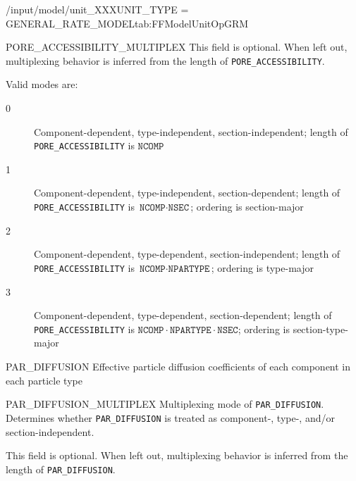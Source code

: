 \begin{condsubgroup}{/input/model/unit\_XXX}{UNIT\_TYPE = GENERAL\_RATE\_MODEL}{tab:FFModelUnitOpGRM}
\begin{dataset}[unit=--,type=int,range={$\{0, \dots, 3 \}$},length={1}]{PORE\_ACCESSIBILITY\_MULTIPLEX}
    This field is optional.
    When left out, multiplexing behavior is inferred from the length of \texttt{PORE\_ACCESSIBILITY}.

    Valid modes are:
    \begin{description}
      \item[0] Component-dependent, type-independent, section-independent; length of \texttt{PORE\_ACCESSIBILITY} is $\texttt{NCOMP}$
      \item[1] Component-dependent, type-independent, section-dependent; length of \texttt{PORE\_ACCESSIBILITY} is $\texttt{NCOMP} \cdot \texttt{NSEC}$; ordering is section-major
      \item[2] Component-dependent, type-dependent, section-independent; length of \texttt{PORE\_ACCESSIBILITY} is $\texttt{NCOMP} \cdot \texttt{NPARTYPE}$; ordering is type-major
      \item[3] Component-dependent, type-dependent, section-dependent; length of \texttt{PORE\_ACCESSIBILITY} is $\texttt{NCOMP} \cdot \texttt{NPARTYPE} \cdot \texttt{NSEC}$; ordering is section-type-major
    \end{description}\vspace{-\baselineskip}
  \end{dataset}
  \begin{dataset}[unit=\si{\square\metre\of{MP}\per\second},type=double,range={$\geq 0$},length={see \texttt{PAR\_DIFFUSION\_MULTIPLEX}}]{PAR\_DIFFUSION}
    Effective particle diffusion coefficients of each component in each particle type
  \end{dataset}
  \begin{dataset}[unit=--,type=int,range={$\{0, \dots, 3 \}$},length={1}]{PAR\_DIFFUSION\_MULTIPLEX}
    Multiplexing mode of \texttt{PAR\_DIFFUSION}.
    Determines whether \texttt{PAR\_DIFFUSION} is treated as component-, type-, and/or section-independent.

    This field is optional.
    When left out, multiplexing behavior is inferred from the length of \texttt{PAR\_DIFFUSION}.


\end{dataset}
\end{condsubgroup}
